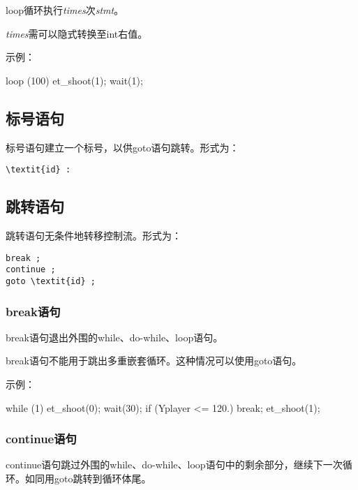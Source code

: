 \documentclass[UTF8]{ctexart}
\begin{document}
loop循环执行\textit{times}次\textit{stmt}。

\textit{times}需可以隐式转换至int右值。

示例：

\begin{MUAvbt}
loop (100) {
	et_shoot(1);
	wait(1);
}
\end{MUAvbt}

\subsection{标号语句}

标号语句建立一个标号，以供goto语句跳转。形式为：

\begin{Verbatim}[frame=single, rulecolor=\color{magenta}, commandchars=\\\{\}]
\textit{id} :
\end{Verbatim}

\subsection{跳转语句}

跳转语句无条件地转移控制流。形式为：

\begin{Verbatim}[frame=single, rulecolor=\color{magenta}, commandchars=\\\{\}]
break ;
continue ;
goto \textit{id} ;
\end{Verbatim}

\subsubsection{break语句}

break语句退出外围的while、do-while、loop语句。

break语句不能用于跳出多重嵌套循环。这种情况可以使用goto语句。

示例：

\begin{MUAvbt}
while (1) {
	et_shoot(0);
	wait(30);
	if (Yplayer <= 120.)
		break;
}
et_shoot(1);
\end{MUAvbt}

\subsubsection{continue语句}

continue语句跳过外围的while、do-while、loop语句中的剩余部分，继续下一次循环。如同用goto跳转到循环体尾。
\end{document}
